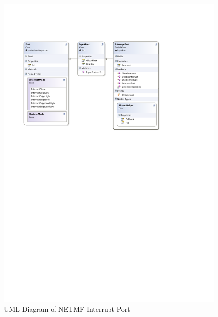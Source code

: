 \begin{figure}[H]\begin{center}
 \centering
  \captionsetup{justification=centering}
  \includegraphics[width=1\textwidth]{pictures/iosharp/interrupt-uml}
  \caption{UML Diagram of NETMF Interrupt Port \label{fig:interrupt-uml}}
\end{center}\end{figure}

